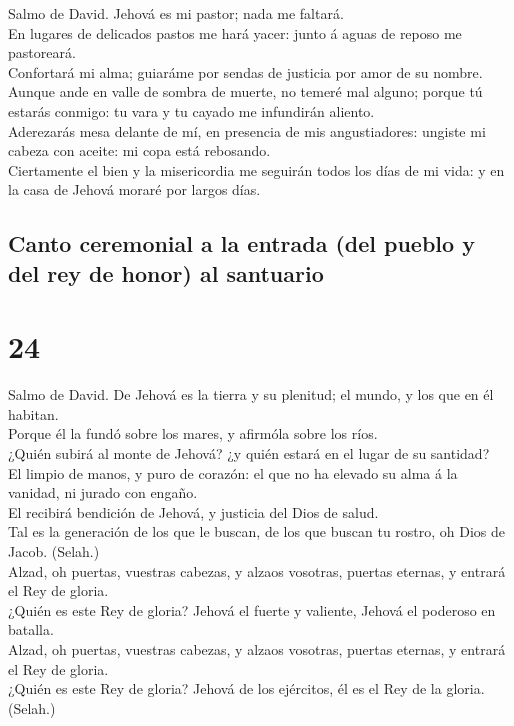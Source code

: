  Salmo de David. Jehová es mi pastor; nada me faltará.\\
 En lugares de delicados pastos me hará yacer: junto á
aguas de reposo me pastoreará.\\
 Confortará mi alma; guiaráme por sendas de justicia por
amor de su nombre.\\
 Aunque ande en valle de sombra de muerte, no temeré mal
alguno; porque tú estarás conmigo: tu vara y tu cayado me infundirán
aliento.\\
 Aderezarás mesa delante de mí, en presencia de mis
angustiadores: ungiste mi cabeza con aceite: mi copa está rebosando.\\
 Ciertamente el bien y la misericordia me seguirán todos
los días de mi vida: y en la casa de Jehová moraré por largos días.

\hypertarget{canto-ceremonial-a-la-entrada-del-pueblo-y-del-rey-de-honor-al-santuario}{%
\subsection{Canto ceremonial a la entrada (del pueblo y del rey de
honor) al
santuario}\label{canto-ceremonial-a-la-entrada-del-pueblo-y-del-rey-de-honor-al-santuario}}

\hypertarget{section-19-24}{%
\section{24}\label{section-19-24}}

 Salmo de David. De Jehová es la tierra y su plenitud; el
mundo, y los que en él habitan.\\
 Porque él la fundó sobre los mares, y afirmóla sobre los
ríos.\\
 ¿Quién subirá al monte de Jehová? ¿y quién estará en el
lugar de su santidad?\\
 El limpio de manos, y puro de corazón: el que no ha
elevado su alma á la vanidad, ni jurado con engaño.\\
 El recibirá bendición de Jehová, y justicia del Dios de
salud.\\
 Tal es la generación de los que le buscan, de los que
buscan tu rostro, oh Dios de Jacob. (Selah.)\\
 Alzad, oh puertas, vuestras cabezas, y alzaos vosotras,
puertas eternas, y entrará el Rey de gloria.\\
 ¿Quién es este Rey de gloria? Jehová el fuerte y
valiente, Jehová el poderoso en batalla.\\
 Alzad, oh puertas, vuestras cabezas, y alzaos vosotras,
puertas eternas, y entrará el Rey de gloria.\\
 ¿Quién es este Rey de gloria? Jehová de los ejércitos,
él es el Rey de la gloria. (Selah.)

